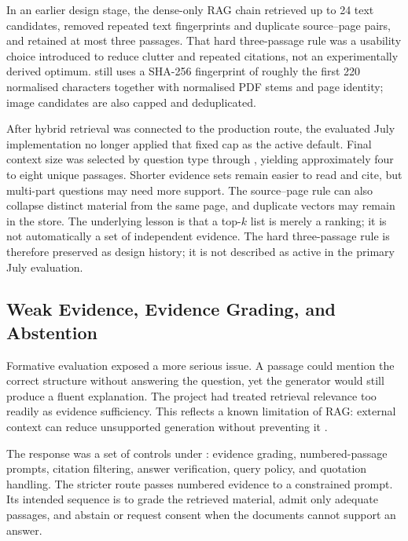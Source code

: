 In an earlier design stage, the dense-only RAG chain retrieved up to 24 text candidates, removed repeated text fingerprints and duplicate source--page pairs, and retained at most three passages. That hard three-passage rule was a usability choice introduced to reduce clutter and repeated citations, not an experimentally derived optimum.  still uses a SHA-256 fingerprint of roughly the first 220 normalised characters together with normalised PDF stems and page identity; image candidates are also capped and deduplicated.

After hybrid retrieval was connected to the production route, the evaluated July implementation no longer applied that fixed cap as the active default. Final context size was selected by question type through , yielding approximately four to eight unique passages. Shorter evidence sets remain easier to read and cite, but multi-part questions may need more support. The source--page rule can also collapse distinct material from the same page, and duplicate vectors may remain in the store. The underlying lesson is that a top-$k$ list is merely a ranking; it is not automatically a set of independent evidence. The hard three-passage rule is therefore preserved as design history; it is not described as active in the primary July evaluation.

\subsection{Weak Evidence, Evidence Grading, and Abstention}
\label{sec:evolution-grounding-controls}

Formative evaluation exposed a more serious issue. A passage could mention the correct structure without answering the question, yet the generator would still produce a fluent explanation. The project had treated retrieval relevance too readily as evidence sufficiency. This reflects a known limitation of RAG: external context can reduce unsupported generation without preventing it \parencite{lewis2020,ji2023}.

The response was a set of controls under : evidence grading, numbered-passage prompts, citation filtering, answer verification, query policy, and quotation handling. The stricter  route passes numbered evidence to a constrained prompt. Its intended sequence is to grade the retrieved material, admit only adequate passages, and abstain or request consent when the documents cannot support an answer.

